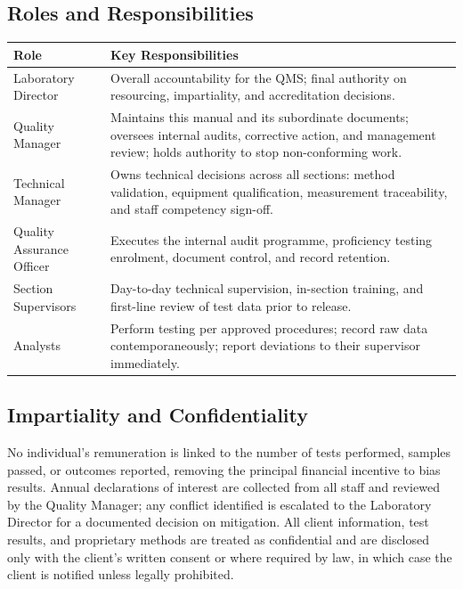 \subsection{Roles and Responsibilities}

\begin{table}[h]
\centering
\small
\renewcommand{\arraystretch}{1.35}
\begin{tabularx}{\linewidth}{@{}l X@{}}
\toprule
\textbf{Role} & \textbf{Key Responsibilities} \\
\midrule
Laboratory Director & Overall accountability for the QMS; final authority on resourcing,
impartiality, and accreditation decisions. \\
Quality Manager & Maintains this manual and its subordinate documents; oversees internal
audits, corrective action, and management review; holds authority to stop non-conforming
work. \\
Technical Manager & Owns technical decisions across all sections: method validation, equipment
qualification, measurement traceability, and staff competency sign-off. \\
Quality Assurance Officer & Executes the internal audit programme, proficiency testing
enrolment, document control, and record retention. \\
Section Supervisors & Day-to-day technical supervision, in-section training, and first-line
review of test data prior to release. \\
Analysts & Perform testing per approved procedures; record raw data contemporaneously; report
deviations to their supervisor immediately. \\
\bottomrule
\end{tabularx}
\end{table}

\subsection{Impartiality and Confidentiality}

No individual's remuneration is linked to the number of tests performed, samples passed, or
outcomes reported, removing the principal financial incentive to bias results. Annual
declarations of interest are collected from all staff and reviewed by the Quality Manager;
any conflict identified is escalated to the Laboratory Director for a documented decision on
mitigation. All client information, test results, and proprietary methods are treated as
confidential and are disclosed only with the client's written consent or where required by
law, in which case the client is notified unless legally prohibited.
